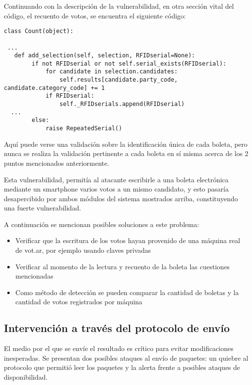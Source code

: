 Continuando con la descripción de la vulnerabilidad, en otra sección vital del código, el recuento de votos, se encuentra el siguiente código:

\begin{lstlisting}
class Count(object):

 ...
   def add_selection(self, selection, RFIDserial=None):
        if not RFIDserial or not self.serial_exists(RFIDserial):
            for candidate in selection.candidates:
                self.results[candidate.party_code, candidate.category_code] += 1
            if RFIDserial:
                self._RFIDserials.append(RFIDserial)
  ...
        else:
            raise RepeatedSerial()
\end{lstlisting}

Aquí puede verse una validación sobre la identificación única de cada boleta, pero nunca se realiza la validación pertinente a cada boleta en sí misma acerca de los 2 puntos mencionados anteriormente.

Esta vulnerabilidad, permitía al atacante escribirle a una boleta electrónica mediante un smartphone varios votos a un mismo candidato, y esto pasaría desapercibido por ambos módulos del sistema mostrados arriba, constituyendo una fuerte vulnerabilidad.

A continuación se mencionan posibles soluciones a este problema:

\begin{itemize}
	\item Verificar que la escritura de los votos hayan provenido de una máquina real de vot.ar, por ejemplo usando claves privadas
	\item Verificar al momento de la lectura y recuento de la boleta las cuestiones mencionadas
	\item Como método de detección se pueden comparar la cantidad de boletas y la cantidad de votos registrados por máquina
\end{itemize}


\subsection{Intervención a través del protocolo de envío}

El medio por el que se envíe el resultado es crítico para evitar modificaciones inesperadas. Se presentan dos posibles ataques al envío de paquetes: un quiebre al protocolo que permitió leer los paquetes y la alerta frente a posibles ataques de disponibilidad.

